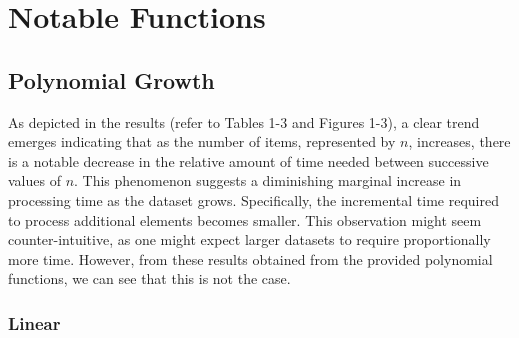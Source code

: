 \documentclass{article}
\begin{document}

\section{Notable Functions}

    \subsection{Polynomial Growth}

    As depicted in the results (refer to Tables 1-3 and Figures 1-3), a clear trend emerges indicating that as the number of items, represented by $n$, increases, there is a notable decrease in the relative amount of time needed between successive values of $n$. This phenomenon suggests a diminishing marginal increase in processing time as the dataset grows. Specifically, the incremental time required to process additional elements becomes smaller. This observation might seem counter-intuitive, as one might expect larger datasets to require proportionally more time. However, from these results obtained from the provided polynomial functions, we can see that this is not the case. 

    \subsubsection{Linear}
\end{document}
